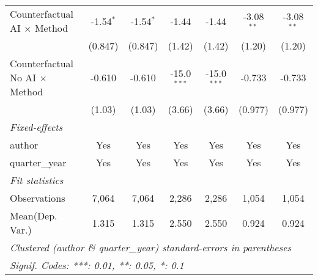 \begin{tabular}{lcccccc}
   Counterfactual AI $\times$ Method     & -1.54$^{*}$   & -1.54$^{*}$   & -1.44         & -1.44         & -3.08$^{**}$  & -3.08$^{**}$\\   
                                         & (0.847)       & (0.847)       & (1.42)        & (1.42)        & (1.20)        & (1.20)\\   
   Counterfactual No AI $\times$ Method  & -0.610        & -0.610        & -15.0$^{***}$ & -15.0$^{***}$ & -0.733        & -0.733\\   
                                         & (1.03)        & (1.03)        & (3.66)        & (3.66)        & (0.977)       & (0.977)\\   
   \midrule
   \emph{Fixed-effects}\\
   author                                & Yes           & Yes           & Yes           & Yes           & Yes           & Yes\\  
   quarter\_year                         & Yes           & Yes           & Yes           & Yes           & Yes           & Yes\\  
   \midrule
   \emph{Fit statistics}\\
   Observations                          & 7,064         & 7,064         & 2,286         & 2,286         & 1,054         & 1,054\\  
Mean(Dep. Var.) & 1.315 & 1.315 & 2.550 & 2.550 & 0.924 & 0.924 \\
   \midrule \midrule
   \multicolumn{7}{l}{\emph{Clustered (author \& quarter\_year) standard-errors in parentheses}}\\
   \multicolumn{7}{l}{\emph{Signif. Codes: ***: 0.01, **: 0.05, *: 0.1}}\\
\end{tabular}
\par\endgroup
